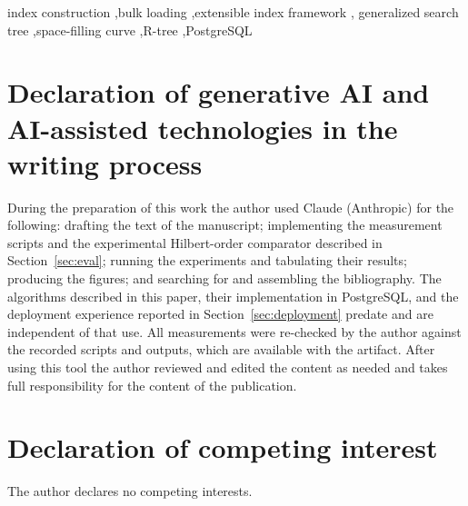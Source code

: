\documentclass[preprint, 11pt]{elsarticle}
\begin{document}
\begin{frontmatter}
\begin{abstract}
The design is implemented in PostgreSQL, has shipped since release~14 and has
been the default strategy for a family of operator classes since release~18. It
is evaluated on uniform and clustered synthetic data and on 138 million
OpenStreetMap coordinates, against insertion-based construction,
occupancy-based sorted construction and Hilbert-order packing, together with a
five-year deployment history including the one case in which the correctness
condition of the method was violated in production. Two findings were not
anticipated: the order and the split rule interact asymmetrically, an elaborate
space-filling curve helping only while the split rule is naive; and on the real
dataset insertion is \emph{no better} than occupancy-based packing, reversing
the ordering seen on uniform data and suggesting that the advantage of local
insertion does not survive skew.
\end{abstract}

\begin{keyword}
index construction \sep bulk loading \sep extensible index framework \sep
generalized search tree \sep space-filling curve \sep R-tree \sep PostgreSQL
\end{keyword}

\end{frontmatter}




\section*{Declaration of generative AI and AI-assisted technologies in the writing process}

During the preparation of this work the author used Claude (Anthropic) for the
following: drafting the text of the manuscript; implementing the measurement
scripts and the experimental Hilbert-order comparator described in
Section~\ref{sec:eval}; running the experiments and tabulating their results;
producing the figures; and searching for and assembling the bibliography. The
algorithms described in this paper, their implementation in PostgreSQL, and the
deployment experience reported in Section~\ref{sec:deployment} predate and are
independent of that use. All measurements were re-checked by the author against
the recorded scripts and outputs, which are available with the artifact. After
using this tool the author reviewed and edited the content as needed and takes
full responsibility for the content of the publication.

\section*{Declaration of competing interest}

The author declares no competing interests.



\end{document}
